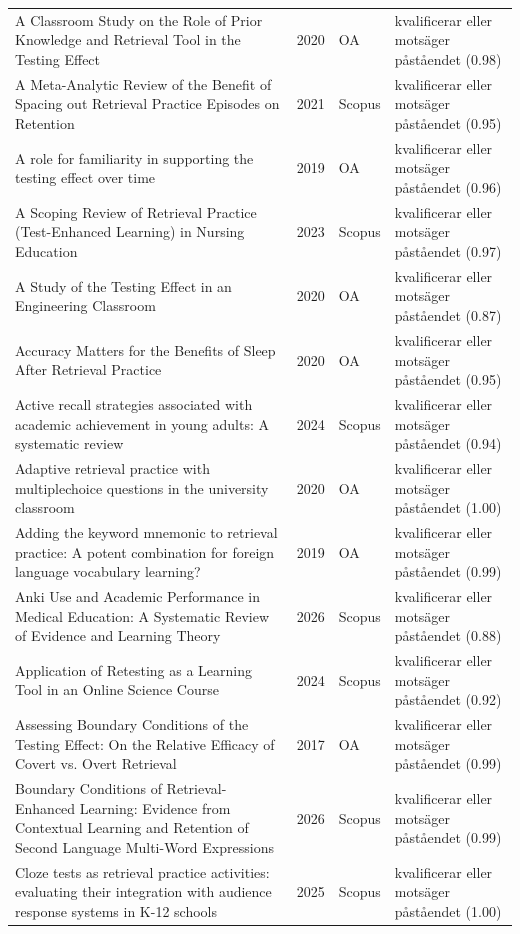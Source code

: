 \begin{longtable}{@{}%
  >{\raggedright\arraybackslash}p{}c%
  >{\raggedright\arraybackslash}p{}%
  >{\raggedright\arraybackslash}p{}@{}}
A Classroom Study on the Role of Prior Knowledge and Retrieval Tool in the Testing Effect & 2020 & OA & kvalificerar eller motsäger påståendet (0.98) \\
A Meta-Analytic Review of the Benefit of Spacing out Retrieval Practice Episodes on Retention & 2021 & Scopus & kvalificerar eller motsäger påståendet (0.95) \\
A role for familiarity in supporting the testing effect over time & 2019 & OA & kvalificerar eller motsäger påståendet (0.96) \\
A Scoping Review of Retrieval Practice (Test-Enhanced Learning) in Nursing Education & 2023 & Scopus & kvalificerar eller motsäger påståendet (0.97) \\
A Study of the Testing Effect in an Engineering Classroom & 2020 & OA & kvalificerar eller motsäger påståendet (0.87) \\
Accuracy Matters for the Benefits of Sleep After Retrieval Practice & 2020 & OA & kvalificerar eller motsäger påståendet (0.95) \\
Active recall strategies associated with academic achievement in young adults: A systematic review & 2024 & Scopus & kvalificerar eller motsäger påståendet (0.94) \\
Adaptive retrieval practice with multiplechoice questions in the university classroom & 2020 & OA & kvalificerar eller motsäger påståendet (1.00) \\
Adding the keyword mnemonic to retrieval practice: A potent combination for foreign language vocabulary learning? & 2019 & OA & kvalificerar eller motsäger påståendet (0.99) \\
Anki Use and Academic Performance in Medical Education: A Systematic Review of Evidence and Learning Theory & 2026 & Scopus & kvalificerar eller motsäger påståendet (0.88) \\
Application of Retesting as a Learning Tool in an Online Science Course & 2024 & Scopus & kvalificerar eller motsäger påståendet (0.92) \\
Assessing Boundary Conditions of the Testing Effect: On the Relative Efficacy of Covert vs. Overt Retrieval & 2017 & OA & kvalificerar eller motsäger påståendet (0.99) \\
Boundary Conditions of Retrieval-Enhanced Learning: Evidence from Contextual Learning and Retention of Second Language Multi-Word Expressions & 2026 & Scopus & kvalificerar eller motsäger påståendet (0.99) \\
Cloze tests as retrieval practice activities: evaluating their integration with audience response systems in K-12 schools & 2025 & Scopus & kvalificerar eller motsäger påståendet (1.00) \\

\end{longtable}
